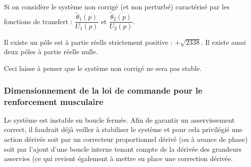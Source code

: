 
\ifprof\begin{corrige}

Si on considère le système non corrigé (et non perturbé) caractérisé par les fonctions de transfert : $\dfrac{\tilde{\theta}_1(p)}{U_1(p)}$ et $\dfrac{\tilde{\theta}_2(p)}{U_2(p)}$.

Il existe un pôle est à partie réelle strictement positive : $+\sqrt{2338}$. Il existe aussi deux pôles à partie réelle nulle.

Ceci laisse à penser que le système non corrigé ne sera pas stable.
\end{corrige}\else\fi

\subsubsection{Dimensionnement de la loi de commande pour le renforcement musculaire}

\ifprof\begin{corrige}
Le système est instable en boucle fermée. Afin de garantir un asservissement correct, il faudrait déjà veiller à stabiliser le système et pour cela privilégié une action dérivée soit par un correcteur proportionnel dérivé (ou à avance de phase) soit par l'ajout d'une boucle interne tenant compte de la dérivée des grandeurs asservies (ce qui revient également à mettre en place une correction dérivée.
\end{corrige}\else\fi


